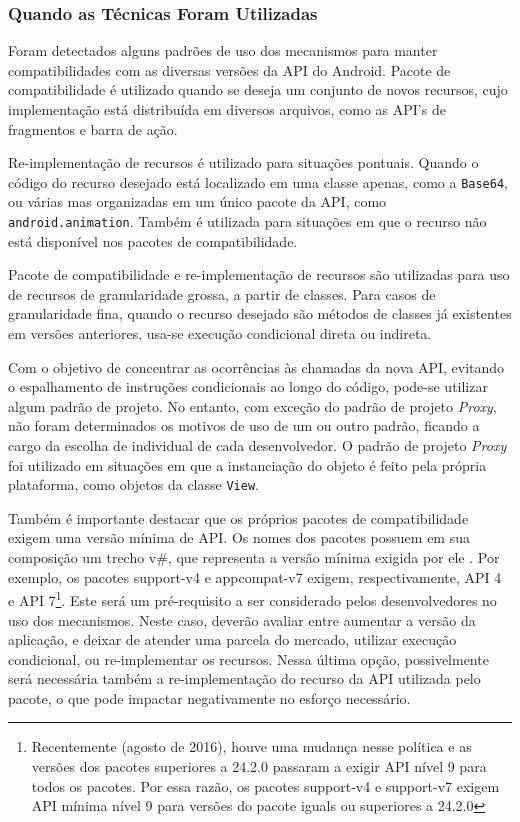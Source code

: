 \subsubsection{Quando as Técnicas Foram Utilizadas}

Foram detectados alguns padrões de uso dos mecanismos para manter compatibilidades com
as diversas versões da API do Android. Pacote de compatibilidade é utilizado quando se
deseja um conjunto de novos recursos, cujo implementação está distribuída em diversos
arquivos, como as API's de fragmentos e barra de ação.

Re-implementação de recursos é utilizado para situações pontuais. Quando o código do
recurso desejado está localizado em uma classe apenas, como a \texttt{Base64},  ou
várias mas organizadas em um único pacote da API, como \texttt{android.animation}.
Também é utilizada para situações em que o recurso não está disponível nos pacotes
de compatibilidade.

Pacote de compatibilidade e re-implementação de recursos são utilizadas para uso de
recursos de granularidade grossa, a partir de classes. Para casos de granularidade
fina, quando o recurso desejado são métodos de classes já existentes em versões
anteriores, usa-se execução condicional direta ou indireta.

Com o objetivo de concentrar as ocorrências às chamadas da nova API, evitando o
espalhamento de instruções condicionais ao longo do código, pode-se utilizar algum
padrão de projeto. No entanto, com exceção do padrão de projeto \textit{Proxy},
não foram determinados os motivos de uso de um ou outro padrão, ficando a cargo da
escolha de individual de cada desenvolvedor. O padrão de projeto \textit{Proxy} foi
utilizado em situações em que a instanciação do objeto é feito pela própria plataforma,
como objetos da classe \texttt{View}.

Também é importante destacar que os próprios pacotes de compatibilidade exigem uma
versão mínima de API. Os nomes dos pacotes possuem em sua composição um trecho v\#,
que representa a versão mínima exigida por ele \cite{SupportLibrary2017}. 
Por exemplo, os pacotes support-v4 e appcompat-v7 exigem, respectivamente, API 4 e
API 7\footnote{Recentemente (agosto de 2016), houve uma mudança nesse política e
as versões dos pacotes superiores a 24.2.0 passaram a exigir API nível 9 para todos
os pacotes. Por essa razão, os pacotes support-v4 e support-v7 exigem API mínima nível
9 para versões do pacote iguals ou superiores a 24.2.0}. Este será um pré-requisito a
ser considerado pelos desenvolvedores no uso dos mecanismos. Neste caso, deverão avaliar
entre aumentar a versão da aplicação, e deixar de atender uma parcela do mercado, utilizar
execução condicional, ou re-implementar os recursos. Nessa última opção, possivelmente será necessária também a re-implementação do recurso da API utilizada pelo pacote, o que pode
impactar negativamente no esforço necessário.   

